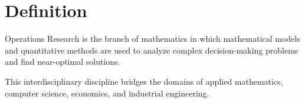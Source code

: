 \section{Definition}

\begin{definition}
    Operations Research is the branch of mathematics in which mathematical models and quantitative methods are used to analyze complex decision-making problems and find near-optimal solutions.
\end{definition}
This interdisciplinary discipline bridges the domains of applied mathematics, computer science, economics, and industrial engineering.